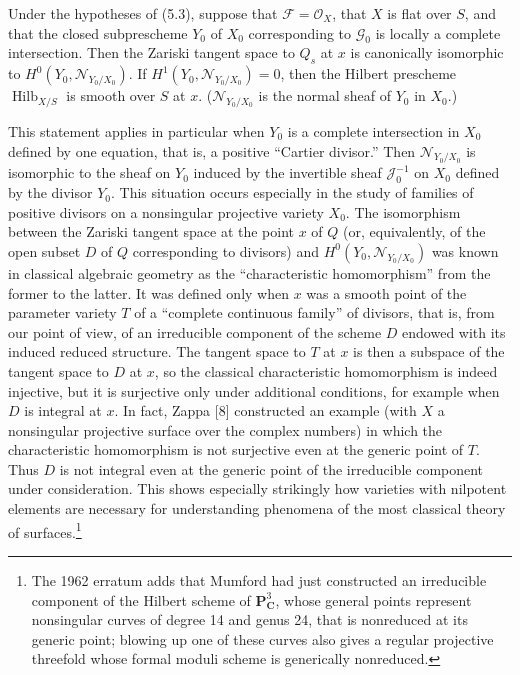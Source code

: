  Under the hypotheses of (5.3), suppose that
$\mathcal F=\mathcal O_X$, that $X$ is flat over $S$, and that the closed
subprescheme $Y_0$ of $X_0$ corresponding to $\mathcal G_0$ is locally a
complete intersection. Then the Zariski tangent space to $Q_s$ at $x$ is
canonically isomorphic to $H^0(Y_0,\mathcal N_{Y_0/X_0})$. If
$H^1(Y_0,\mathcal N_{Y_0/X_0})=0$, then the Hilbert prescheme
$\operatorname{Hilb}_{X/S}$ is smooth over $S$ at $x$.
($\mathcal N_{Y_0/X_0}$ is the normal sheaf of $Y_0$ in $X_0$.)

 This statement applies in particular when $Y_0$ is a
complete intersection in $X_0$ defined by one equation, that is, a positive
“Cartier divisor.” Then $\mathcal N_{Y_0/X_0}$ is isomorphic to the sheaf on
$Y_0$ induced by the invertible sheaf $\mathcal J_0^{-1}$ on $X_0$ defined by the
divisor $Y_0$. This situation occurs especially in the study of families of
positive divisors on a nonsingular projective variety $X_0$. The isomorphism
between the Zariski tangent space at the point $x$ of $Q$ (or, equivalently,
of the open subset $D$ of $Q$ corresponding to divisors) and
$H^0(Y_0,\mathcal N_{Y_0/X_0})$ was known in classical algebraic geometry as
the “characteristic homomorphism” from the former to the latter. It was defined
only when $x$ was a smooth point of the parameter variety $T$ of a “complete
continuous family” of divisors, that is, from our point of view, of an
irreducible component of the scheme $D$ endowed with its induced reduced
structure. The
tangent space to $T$ at $x$ is then a subspace of the tangent space to $D$ at
$x$, so the classical characteristic homomorphism is indeed injective, but it
is surjective only under additional conditions, for example when $D$ is
integral at $x$. In fact, Zappa [8] constructed an example
(with $X$ a nonsingular projective surface over the complex numbers) in which
the characteristic homomorphism is not surjective even at the generic point of
$T$. Thus $D$ is not integral even at the generic point of the irreducible
component under consideration. This shows especially strikingly how varieties
with nilpotent elements are necessary for understanding phenomena of the most
classical theory of surfaces.\footnote{The 1962 erratum adds that Mumford had
just constructed an irreducible component of the Hilbert scheme of
$\mathbf P^3_{\mathbf C}$, whose general points represent nonsingular curves of
degree 14 and genus 24, that is nonreduced at its generic point; blowing up one
of these curves also gives a regular projective threefold whose formal moduli
scheme is generically nonreduced.}

